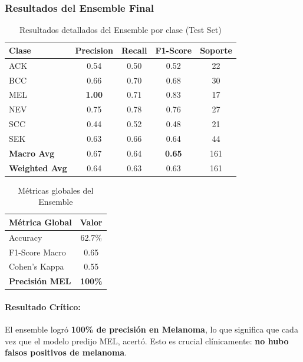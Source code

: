 \documentclass[12pt,a4paper]{article}
\begin{document}
\subsubsection{Resultados del Ensemble Final}

\begin{table}[H]
\centering
\begin{tabular}{lcccc}
\toprule
\textbf{Clase} & \textbf{Precision} & \textbf{Recall} & \textbf{F1-Score} & \textbf{Soporte} \\
\midrule
ACK & 0.54 & 0.50 & 0.52 & 22 \\
BCC & 0.66 & 0.70 & 0.68 & 30 \\
\rowcolor{green!20} MEL & \textbf{1.00} & 0.71 & 0.83 & 17 \\
NEV & 0.75 & 0.78 & 0.76 & 27 \\
SCC & 0.44 & 0.52 & 0.48 & 21 \\
SEK & 0.63 & 0.66 & 0.64 & 44 \\
\midrule
\textbf{Macro Avg} & 0.67 & 0.64 & \textbf{0.65} & 161 \\
\textbf{Weighted Avg} & 0.64 & 0.63 & 0.63 & 161 \\
\bottomrule
\end{tabular}
\caption{Resultados detallados del Ensemble por clase (Test Set)}
\label{tab:ensemble_detalle}
\end{table}

\begin{table}[H]
\centering
\begin{tabular}{lc}
\toprule
\textbf{Métrica Global} & \textbf{Valor} \\
\midrule
Accuracy & 62.7\% \\
F1-Score Macro & 0.65 \\
Cohen's Kappa & 0.55 \\
\rowcolor{green!20} \textbf{Precisión MEL} & \textbf{100\%} \\
\bottomrule
\end{tabular}
\caption{Métricas globales del Ensemble}
\label{tab:ensemble_global}
\end{table}

\paragraph{Resultado Crítico:} El ensemble logró \textbf{100\% de precisión en Melanoma}, lo que significa que cada vez que el modelo predijo MEL, acertó. Esto es crucial clínicamente: \textbf{no hubo falsos positivos de melanoma}.
\end{document}
